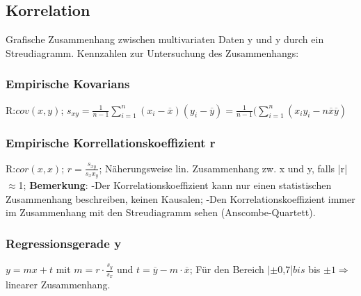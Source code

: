       \subsection{Korrelation}
      Grafische Zusammenhang zwischen multivariaten Daten y und y durch ein Streudiagramm. Kennzahlen zur Untersuchung des Zusammenhangs:
      \subsubsection{Empirische Kovarians}
      R:$cov(x,y)$;
      $s_{xy} = \frac{1}{n-1}\sum_{i=1}^{n}(x_{i}-\overline{x})(y_{i}-\overline{y})=\frac{1}{n-1}(\sum_{i=1}^{n}(x_{i}y_{i}- n\overline{x}\overline{y})$
      \subsubsection{Empirische Korrellationskoeffizient r}
      R:$cor(x,x)$;
      $r = \frac{s_{xy}}{s_{x}x_{y}}$; Näherungsweise lin. Zusammenhang zw. x und y, falls |r| $\approx$1;
      \textbf{Bemerkung}: -Der Korrelationskoeffizient kann nur einen statistischen Zusammenhang beschreiben, keinen Kausalen; -Den Korrelationskoeffizient immer im Zusammenhang mit den Streudiagramm sehen (Anscombe-Quartett).
      \subsubsection{Regressionsgerade y}
      $y = mx + t$ mit $m=r \cdot \frac{s_{y}}{s_{x}}$ und $ t=\overline{y} -m \cdot \overline{x}$;
      Für den Bereich $|\pm$0,7|$ bis $ bis $\pm 1   \Rightarrow $ linearer Zusammenhang.